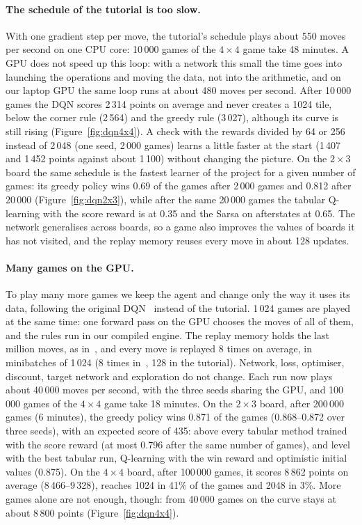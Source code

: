 \documentclass[11pt,a4paper]{article}
\theoremstyle{remark}
\begin{document}
\paragraph{The schedule of the tutorial is too slow.} With one gradient step per move, the tutorial's schedule plays about 550 moves per second on one CPU core: 10\,000 games of the $4\times4$ game take 48 minutes. A GPU does not speed up this loop: with a network this small the time goes into launching the operations and moving the data, not into the arithmetic, and on our laptop GPU the same loop runs at about 480 moves per second. After 10\,000 games the DQN scores 2\,314 points on average and never creates a 1024 tile, below the corner rule (2\,564) and the greedy rule (3\,027), although its curve is still rising (Figure~\ref{fig:dqn4x4}). A check with the rewards divided by 64 or 256 instead of 2\,048 (one seed, 2\,000 games) learns a little faster at the start (1\,407 and 1\,452 points against about 1\,100) without changing the picture. On the $2\times3$ board the same schedule is the fastest learner of the project for a given number of games: its greedy policy wins 0.69 of the games after 2\,000 games and 0.812 after 20\,000 (Figure~\ref{fig:dqn2x3}), while after the same 20\,000 games the tabular Q-learning with the score reward is at 0.35 and the Sarsa on afterstates at 0.65. The network generalises across boards, so a game also improves the values of boards it has not visited, and the replay memory reuses every move in about 128 updates.

\paragraph{Many games on the GPU.} To play many more games we keep the agent and change only the way it uses its data, following the original DQN~\cite{mnih2015} instead of the tutorial. 1\,024 games are played at the same time: one forward pass on the GPU chooses the moves of all of them, and the rules run in our compiled engine. The replay memory holds the last million moves, as in~\cite{mnih2015}, and every move is replayed 8 times on average, in minibatches of 1\,024 (8 times in~\cite{mnih2015}, 128 in the tutorial). Network, loss, optimiser, discount, target network and exploration do not change. Each run now plays about 40\,000 moves per second, with the three seeds sharing the GPU, and 100\,000 games of the $4\times4$ game take 18 minutes. On the $2\times3$ board, after 200\,000 games (6 minutes), the greedy policy wins 0.871 of the games (0.868--0.872 over three seeds), with an expected score of 435: above every tabular method trained with the score reward (at most 0.796 after the same number of games), and level with the best tabular run, Q-learning with the win reward and optimistic initial values (0.875). On the $4\times4$ board, after 100\,000 games, it scores 8\,862 points on average (8\,466--9\,328), reaches 1024 in 41\% of the games and 2048 in 3\%. More games alone are not enough, though: from 40\,000 games on the curve stays at about 8\,800 points (Figure~\ref{fig:dqn4x4}).
\end{document}
